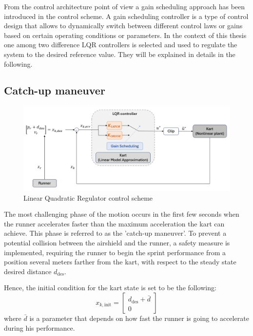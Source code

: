 \documentclass[a4paper,12pt,oneside]{book}
\begin{document}
\bigskip
From the control architecture point of view a gain scheduling approach has been introduced in the control scheme.
A gain scheduling controller is a type of control design that allows to dynamically switch between different control laws or gains based on certain operating conditions or parameters.
In the context of this thesis one among two difference LQR controllers is selected and used to regulate the system to the desired reference value.
They will be explained in details in the following.

\subsection{Catch-up maneuver}
\begin{figure}
	\centering
	\includegraphics[width=1.0\textwidth]{LQR_sim_scheme.png}
	\caption{Linear Quadratic Regulator control scheme}
	\label{image:LQR_sim_scheme}
\end{figure}

The most challenging phase of the motion occurs in the first few seconds when the runner accelerates faster than the maximum acceleration the kart can achieve.
This phase is referred to as the 'catch-up maneuver'.
To prevent a potential collision between the airshield and the runner, a safety measure is implemented, requiring the runner to begin the sprint performance from a position several meters farther from the kart, with respect to the steady state desired distance $d_{\text{des}}$.

Hence, the initial condition for the kart state is set to be the following:
\begin{equation}
    x_{k,\text{init}} =
    \begin{bmatrix}
        d_{\text{des}} + \bar{d} \\
        0
    \end{bmatrix}
\end{equation}
where $\bar{d}$ is a parameter that depends on how fast the runner is going to accelerate during his performance. 
 
\end{document}
